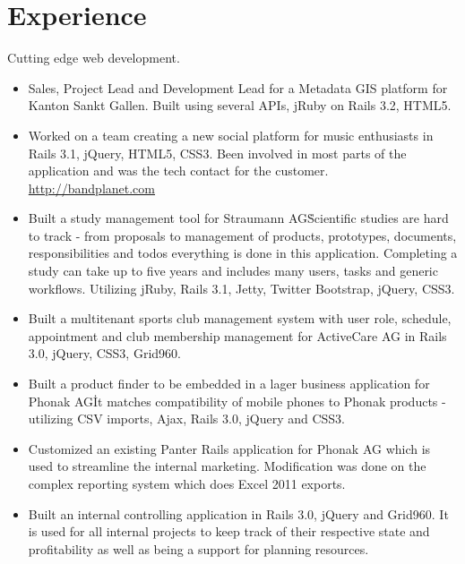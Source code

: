 \documentclass[10pt,a4paper]{moderncv}
\begin{document}
\maketitle

\section{Experience}
{Cutting edge web development.\newline{}%
\begin{itemize}%
  \item Sales, Project Lead and Development Lead for a Metadata GIS platform
  for Kanton Sankt Gallen. Built using several APIs, jRuby on Rails 3.2, HTML5.
  \item Worked on a team creating a new social platform for music enthusiasts
    in Rails 3.1, jQuery, HTML5, CSS3. Been involved in most parts of the application
    and was the tech contact for the customer.\\
        \url{http://bandplanet.com}
  \item Built a study management tool for Straumann AG\. Scientific studies are
    hard to track - from proposals to management of
    products, prototypes, documents, responsibilities and todos everything is done
    in this application. Completing a study can take up to five years and
    includes many users, tasks and generic workflows. Utilizing jRuby, Rails
    3.1, Jetty, Twitter Bootstrap, jQuery, CSS3.
  \item Built a multitenant sports club management system with user role,
    schedule, appointment and club membership management for ActiveCare AG in
    Rails 3.0, jQuery, CSS3, Grid960.
  \item Built a product finder to be embedded in a lager business application
    for Phonak AG\. It matches compatibility of mobile phones to Phonak
    products - utilizing CSV imports, Ajax, Rails 3.0, jQuery and
    CSS3.
  \item Customized an existing Panter Rails application for Phonak AG which
    is used to streamline the internal marketing. Modification was done on the
    complex reporting system which does Excel 2011 exports.
  \item Built an internal controlling application in Rails 3.0, jQuery and
    Grid960. It is used for all internal projects to keep track of their
    respective state and profitability as well as being a support for planning
    resources.

\end{itemize}}
\end{document}
